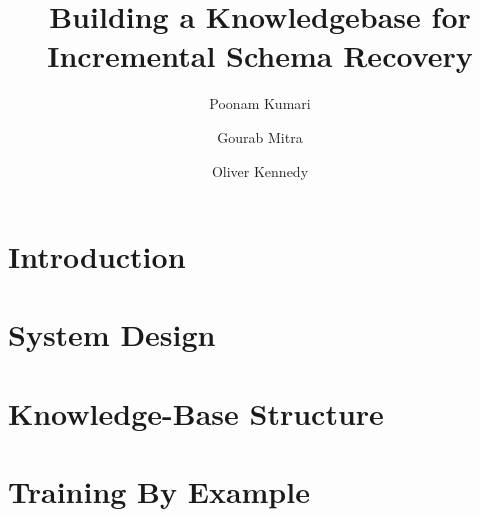 \documentclass[manuscript]{acmart}
\begin{document}
\title{Building a Knowledgebase for Incremental Schema Recovery}


\author{Poonam Kumari}

\author{Gourab Mitra}

\author{Oliver Kennedy}


\renewcommand{\shortauthors}{Kumari et al.}


\begin{abstract}

\end{abstract}

%
%


\maketitle

\section{Introduction}
\label{sec:introduction}


\section{System Design}
\label{sec:system}


\section{Knowledge-Base Structure}
\label{sec:knowledgebase}


\section{Training By Example}
\label{sec:trainbyexample}

\end{document}
